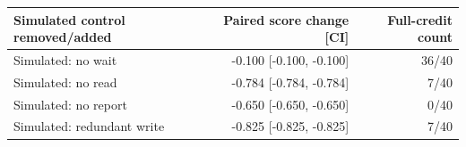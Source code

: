 \begin{tabular}{lrr}\toprule
Simulated control removed/added & Paired score change [CI] & Full-credit count\\ \midrule
Simulated: no wait & -0.100 [-0.100, -0.100] & 36/40\\
Simulated: no read & -0.784 [-0.784, -0.784] & 7/40\\
Simulated: no report & -0.650 [-0.650, -0.650] & 0/40\\
Simulated: redundant write & -0.825 [-0.825, -0.825] & 7/40\\
\bottomrule\end{tabular}
